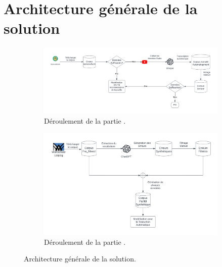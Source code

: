 \section{Architecture générale de la solution}

\begin{figure}[hbt]
    \begin{subfigure}{\textwidth}
        \begin{center}
            \includegraphics[width=\linewidth]{assets/pdf/ASR.pdf}
        \end{center}
        \caption{Déroulement de la partie .}
        \label{fig.asr-archi}
    \end{subfigure}
    \begin{subfigure}{\textwidth}
        \begin{center}
            \includegraphics[width=\linewidth]{assets/pdf/NMT.pdf}
        \end{center}
        \caption{Déroulement de la partie .}
        \label{fig.asr-archi}
    \end{subfigure}
    \caption{Architecture générale de la solution.}
    \label{fig.archi} 
\end{figure}


